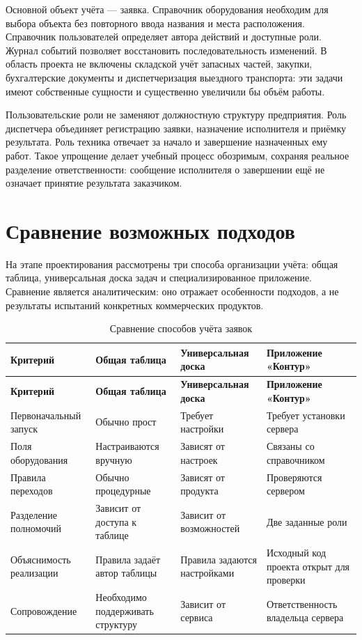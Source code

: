 \documentclass{timcw}
\begin{document}
Основной объект учёта — заявка. Справочник оборудования необходим для выбора объекта без повторного ввода названия и места расположения. Справочник пользователей определяет автора действий и доступные роли. Журнал событий позволяет восстановить последовательность изменений. В область проекта не включены складской учёт запасных частей, закупки, бухгалтерские документы и диспетчеризация выездного транспорта: эти задачи имеют собственные сущности и существенно увеличили бы объём работы.

Пользовательские роли не заменяют должностную структуру предприятия. Роль диспетчера объединяет регистрацию заявки, назначение исполнителя и приёмку результата. Роль техника отвечает за начало и завершение назначенных ему работ. Такое упрощение делает учебный процесс обозримым, сохраняя реальное разделение ответственности: сообщение исполнителя о завершении ещё не означает принятие результата заказчиком.

\section{Сравнение возможных подходов}

На этапе проектирования рассмотрены три способа организации учёта: общая таблица, универсальная доска задач и специализированное приложение. Сравнение является аналитическим: оно отражает особенности подходов, а не результаты испытаний конкретных коммерческих продуктов.

\begingroup\small\singlespacing
\begin{longtable}{>{\raggedright\arraybackslash}p{}>{\raggedright\arraybackslash}p{}>{\raggedright\arraybackslash}p{}>{\raggedright\arraybackslash}p{}}
\caption{Сравнение способов учёта заявок}\\
\hline
\textbf{Критерий} & \textbf{Общая таблица} & \textbf{Универсальная доска} & \textbf{Приложение «Контур»} \\ \hline
\endfirsthead
\textbf{Критерий} & \textbf{Общая таблица} & \textbf{Универсальная доска} & \textbf{Приложение «Контур»} \\ \hline
\endhead
Первоначальный запуск & Обычно прост & Требует настройки & Требует установки сервера \\ \hline
Поля оборудования & Настраиваются вручную & Зависят от настроек & Связаны со справочником \\ \hline
Правила переходов & Обычно процедурные & Зависят от продукта & Проверяются сервером \\ \hline
Разделение полномочий & Зависит от доступа к таблице & Зависит от возможностей & Две заданные роли \\ \hline
Объяснимость реализации & Правила задаёт автор таблицы & Правила задаются настройками & Исходный код проекта открыт для проверки \\ \hline
Сопровождение & Необходимо поддерживать структуру & Зависит от сервиса & Ответственность владельца сервера \\ \hline
\end{longtable}
\endgroup
\end{document}
